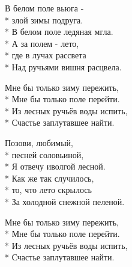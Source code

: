 \medskip

\begin{minipage}{\linewidth}
В белом поле вьюга -\\*
злой зимы подруга.\\*
В белом поле ледяная мгла.\\*
А за полем - лето,\\*
где в лучах рассвета\\*
Над ручьями вишня расцвела.\\
\end{minipage}\par\medskip\nobreak

\medskip

\begin{minipage}{\linewidth}
\hspace*{1.5em}Мне бы только зиму пережить,\\*
\hspace*{1.5em}Мне бы только поле перейти.\\*
\hspace*{1.5em}Из лесных ручьёв воды испить,\\*
\hspace*{1.5em}Счастье заплутавшее найти.\\
\end{minipage}\par\medskip\nobreak

\medskip

\begin{minipage}{\linewidth}
Позови, любимый,\\*
песней соловьиной,\\*
Я отвечу иволгой лесной.\\*
Как же так случилось,\\*
то, что лето скрылось\\*
За холодной снежной пеленой.\\
\end{minipage}\par\medskip\nobreak

\medskip

\begin{minipage}{\linewidth}
\hspace*{1.5em}Мне бы только зиму пережить,\\*
\hspace*{1.5em}Мне бы только поле перейти.\\*
\hspace*{1.5em}Из лесных ручьёв воды испить,\\*
\hspace*{1.5em}Счастье заплутавшее найти.\\
\end{minipage}\par\medskip\nobreak

